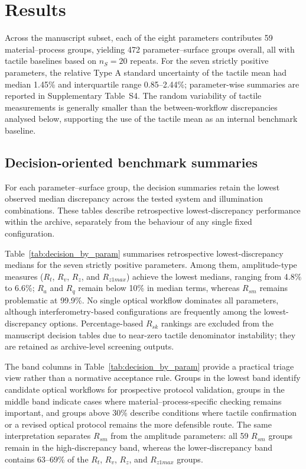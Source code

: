 \documentclass{article}
\begin{document}
\section{Results}

Across the manuscript subset, each of the eight parameters contributes 59 material--process groups, yielding 472 parameter--surface groups overall, all with tactile baselines based on $n_S=20$ repeats. For the seven strictly positive parameters, the relative Type A standard uncertainty of the tactile mean had median 1.45\% and interquartile range 0.85--2.44\%; parameter-wise summaries are reported in Supplementary Table~S4. The random variability of tactile measurements is generally smaller than the between-workflow discrepancies analysed below, supporting the use of the tactile mean as an internal benchmark baseline.

\subsection{Decision-oriented benchmark summaries}
For each parameter--surface group, the decision summaries retain the lowest observed median discrepancy across the tested system and illumination combinations. These tables describe retrospective lowest-discrepancy performance within the archive, separately from the behaviour of any single fixed configuration.

Table~\ref{tab:decision_by_param} summarises retrospective lowest-discrepancy medians for the seven strictly positive parameters. Among them, amplitude-type measures ($R_t$, $R_v$, $R_z$, and $R_{z1max}$) achieve the lowest medians, ranging from 4.8\% to 6.6\%; $R_a$ and $R_q$ remain below 10\% in median terms, whereas $R_{sm}$ remains problematic at 99.9\%. No single optical workflow dominates all parameters, although interferometry-based configurations are frequently among the lowest-discrepancy options. Percentage-based $R_{sk}$ rankings are excluded from the manuscript decision tables due to near-zero tactile denominator instability; they are retained as archive-level screening outputs.

The band columns in Table~\ref{tab:decision_by_param} provide a practical triage view rather than a normative acceptance rule. Groups in the lowest band identify candidate optical workflows for prospective protocol validation, groups in the middle band indicate cases where material--process-specific checking remains important, and groups above 30\% describe conditions where tactile confirmation or a revised optical protocol remains the more defensible route. The same interpretation separates $R_{sm}$ from the amplitude parameters: all 59 $R_{sm}$ groups remain in the high-discrepancy band, whereas the lower-discrepancy band contains 63--69\% of the $R_t$, $R_v$, $R_z$, and $R_{z1max}$ groups.
\end{document}

